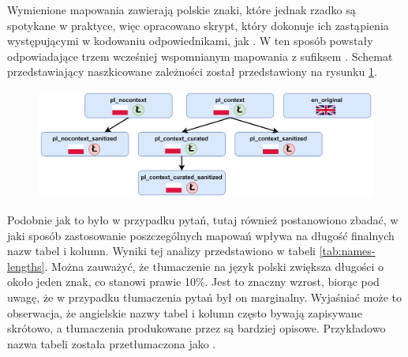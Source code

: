 Wymienione mapowania zawierają polskie znaki, które jednak rzadko są spotykane w praktyce, więc opracowano skrypt, który dokonuje ich zastąpienia występującymi w kodowaniu  odpowiednikami, jak . W ten sposób powstały odpowiadające trzem wcześniej wspomnianym mapowania z sufiksem . Schemat przedstawiający naszkicowane zależności został przedstawiony na rysunku \ref{fig:mappings}.

\begin{figure}[ht!]
  \centering
  \includegraphics[width=1.0\linewidth]{images/mappings.png}
  \label{fig:mappings}
\end{figure}

Podobnie jak to było w przypadku pytań, tutaj również postanowiono zbadać, w jaki sposób zastosowanie poszczególnych mapowań wpływa na długość finalnych nazw tabel i kolumn. Wyniki tej analizy przedstawiono w tabeli \ref{tab:names-lengths}. Można zauważyć, że tłumaczenie na język polski zwiększa długości o około jeden znak, co stanowi prawie 10\%. Jest to znaczny wzrost, biorąc pod uwagę, że w przypadku tłumaczenia pytań był on marginalny. Wyjaśniać może to obserwacja, że angielskie nazwy tabel i kolumn często bywają zapisywane skrótowo, a tłumaczenia produkowane przez  są bardziej opisowe. Przykładowo nazwa tabeli  została przetłumaczona jako .

